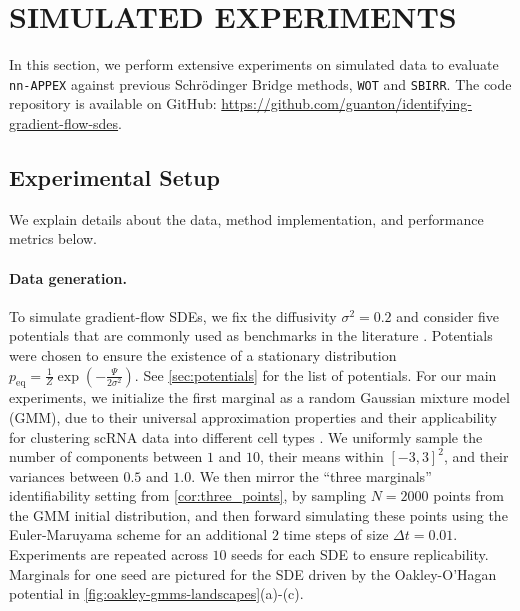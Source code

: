 \documentclass[twoside]{article}
\newcommand{\nappex}{\texttt{nn-APPEX}}
\newcommand{\wot}{\texttt{WOT}}
\newcommand{\sbirr}{\texttt{SBIRR}}
\begin{document}

\section{SIMULATED EXPERIMENTS}
\label{sec:experiments}
In this section, we perform extensive experiments on simulated data to evaluate \nappex{} against previous Schr\"odinger Bridge methods, \wot{} and \sbirr. The code repository is available on GitHub: \url{https://github.com/guanton/identifying-gradient-flow-sdes}.

\subsection{Experimental Setup}
We explain details about the data, method implementation, and performance metrics below. 
\paragraph{Data generation.}
To simulate gradient-flow SDEs, we fix the diffusivity $\sigma^2=0.2$ and consider five potentials that are commonly used as benchmarks in the literature \citep{terpin2024learning, persiianov2025learning}. Potentials were chosen to ensure the existence of a stationary distribution $p_{\mathrm{eq}}=\frac{1}{Z}\exp(-\frac{\Psi}{2\sigma^2})$. See \cref{sec:potentials} for the list of potentials.
For our main experiments, we initialize the first marginal as a random Gaussian mixture model (GMM), due to their universal approximation properties \citep{mclachlan2014number} and their applicability for clustering scRNA data into different cell types \citep{yu2021scgmai}. We uniformly sample the number of components between $1$ and $10$, their means within $[-3,3]^2$, and their variances between $0.5$ and $1.0$. We then mirror the ``three marginals'' identifiability setting from \cref{cor:three_points}, by sampling $N=2000$ points from the GMM initial distribution, and then forward simulating these points using the Euler-Maruyama scheme for an additional $2$ time steps of size $\Delta t = 0.01$. Experiments are repeated across $10$ seeds for each SDE to ensure replicability. Marginals for one seed are pictured for the SDE driven by the Oakley-O'Hagan potential in \cref{fig:oakley-gmms-landscapes}(a)-(c).
\end{document}
